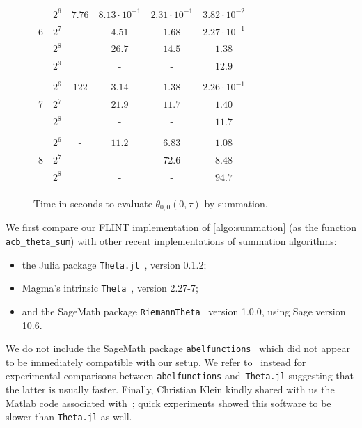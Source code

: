 \documentclass[12pt,oneside]{amsart}
\numberwithin{equation}{section}
\theoremstyle{definition}
\begin{document}
\begin{figure}[p]
{\begin{tabular}{|c|c|cccc|}
          & $2^{6}$ &  $7.76$ & $8.13\cdot 10^{-1}$ & $2.31\cdot 10^{-1}$ & $3.82\cdot 10^{-2}$ \\
      6  & $2^{7}$ & & $4.51$ & $1.68$ & $2.27 \cdot 10^{-1}$ \\
          & $2^{8}$ & & $26.7$ & $14.5$ & $1.38$ \\
          & $2^{9}$ & & - & - & $12.9$ \\ \hline & &&&&\\[-1em]

          & $2^{6}$ &  $122$ & $3.14$ & $1.38$ &  $2.26\cdot 10^{-1}$ \\
      7  & $2^{7}$ & & $21.9$ & $11.7$ & $1.40$ \\
          & $2^{8}$ & & - & - & $11.7$ \\ \hline & &&&&\\[-1em]

          & $2^{6}$ & - & $11.2$ & $6.83$ &  $1.08$ \\
      8  & $2^{7}$ & & - & $72.6$ & $8.48$ \\
          & $2^{8}$ & & - & - & $94.7$ \\ \hline
    \end{tabular} }
  \vspace{-4pt}
  \caption{Time in seconds to evaluate $\theta_{0,0}(0,\tau)$ by summation.}
  \label{fig:compare-sum}
\end{figure}

We first compare our FLINT implementation of \cref{algo:summation} (as the
function \texttt{acb\_theta\_sum}) with other recent implementations of
summation algorithms:
\begin{itemize}
\item the Julia package
  \texttt{Theta.jl}~\cite{agostiniComputingThetaFunctions2021}, version 0.1.2;
\item Magma's intrinsic \texttt{Theta}~\cite{bosmaMagmaAlgebraSystem1997}, version 2.27-7;
\item and the SageMath package
  \texttt{RiemannTheta}~\cite{bruinRiemannThetaSageMathPackage2021} version
  1.0.0, using Sage version 10.6.
\end{itemize}

We do not include the SageMath package
\texttt{abelfunctions}~\cite{swierczewskiComputingRiemannTheta2016} which did
not appear to be immediately compatible with our setup. We refer
to~\cite{agostiniComputingThetaFunctions2021} instead for experimental
comparisons between \texttt{abelfunctions} and~\texttt{Theta.jl} suggesting
that the latter is usually faster. Finally, Christian Klein kindly shared with
us the Matlab code associated
with~\cite{frauendienerEfficientComputationMultidimensional2019}; quick
experiments showed this software to be slower than \texttt{Theta.jl} as well.
\end{document}
